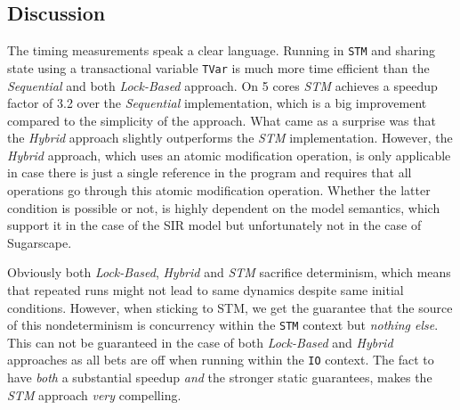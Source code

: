 \subsection{Discussion}

The timing measurements speak a clear language. Running in \texttt{STM} and sharing state using a transactional variable \texttt{TVar} is much more time efficient than the \textit{Sequential} and both \textit{Lock-Based} approach. On 5 cores \textit{STM} achieves a speedup factor of 3.2 over the \textit{Sequential} implementation, which is a big improvement compared to the simplicity of the approach. What came as a surprise was that the \textit{Hybrid} approach slightly outperforms the \textit{STM} implementation. However, the \textit{Hybrid} approach, which uses an atomic modification operation, is only applicable in case there is just a single reference in the program and requires that all operations go through this atomic modification operation. Whether the latter condition is possible or not, is highly dependent on the model semantics, which support it in the case of the SIR model but unfortunately not in the case of Sugarscape.

Obviously both \textit{Lock-Based}, \textit{Hybrid} and \textit{STM} sacrifice determinism, which means that repeated runs might not lead to same dynamics despite same initial conditions. However, when sticking to STM, we get the guarantee that the source of this nondeterminism is concurrency within the \texttt{STM} context but \textit{nothing else}. This can not be guaranteed in the case of both \textit{Lock-Based} and \textit{Hybrid} approaches as all bets are off when running within the \texttt{IO} context. The fact to have \textit{both} a substantial speedup \textit{and} the stronger static guarantees, makes the \textit{STM} approach \textit{very} compelling.